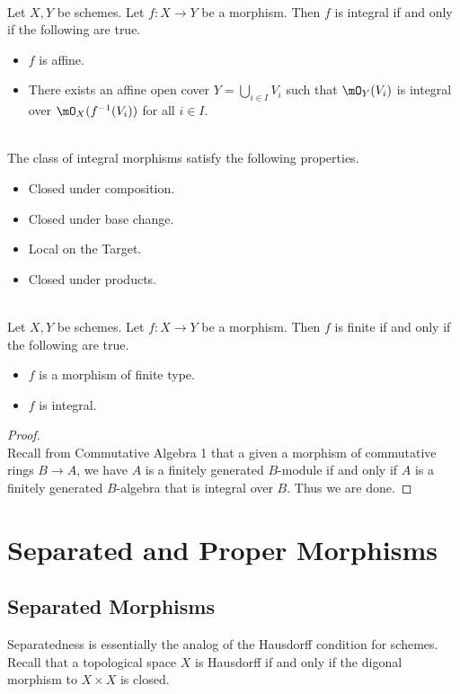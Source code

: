 \documentclass[a4paper]{article}
\begin{document}
\begin{prp}{}{}\\
Let $X,Y$ be schemes. Let $f:X\to Y$ be a morphism. Then $f$ is integral if and only if the following are true. 
\begin{itemize}
\item $f$ is affine. 
\item There exists an affine open cover $Y=\bigcup_{i\in I}V_i$ such that $\mO_Y(V_i)$ is integral over $\mO_X(f^{-1}(V_i))$ for all $i\in I$. 
\end{itemize}
\end{prp}

\begin{lmm}{}{}\\
The class of integral morphisms satisfy the following properties. 
\begin{itemize}
\item Closed under composition. 
\item Closed under base change. 
\item Local on the Target. 
\item Closed under products. 
\end{itemize}
\end{lmm}

\begin{prp}{}{}\\
Let $X,Y$ be schemes. Let $f:X\to Y$ be a morphism. Then $f$ is finite if and only if the following are true. 
\begin{itemize}
\item $f$ is a morphism of finite type. 
\item $f$ is integral. 
\end{itemize}
\begin{proof}\\
Recall from Commutative Algebra 1 that a given a morphism of commutative rings $B\to A$, we have $A$ is a finitely generated $B$-module if and only if $A$ is a finitely generated $B$-algebra that is integral over $B$. Thus we are done. 
\end{proof}
\end{prp}

\pagebreak
\section{Separated and Proper Morphisms}
\subsection{Separated Morphisms}
Separatedness is essentially the analog of the Hausdorff condition for schemes. Recall that a topological space $X$ is Hausdorff if and only if the digonal morphism to $X\times X$ is closed. 
\end{document}

